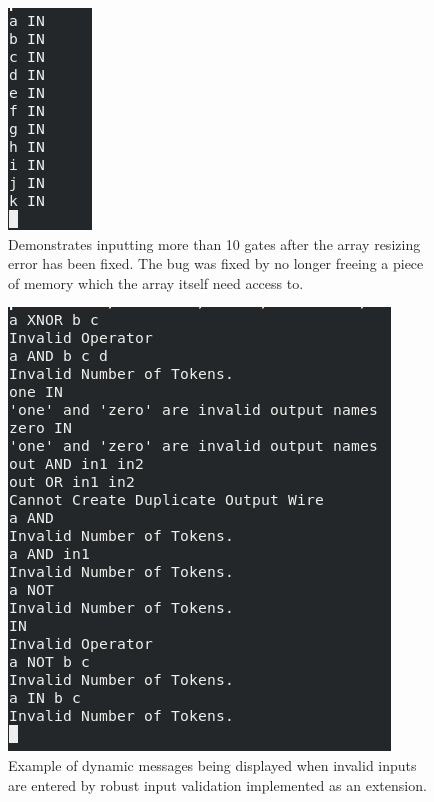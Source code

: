 \documentclass[11]{article}
\begin{document}
				\begin{figure}[h!]
					\caption{Demonstrates inputting more than 10 gates after the array resizing error has been fixed. The bug was fixed by no longer freeing a piece of memory which the array itself need access to.}
					\centering
					\includegraphics[scale=0.6]{FixedArrayListResize.png}
				\end{figure}
				
				\begin{figure}[h!]
					\caption{Example of dynamic messages being displayed when invalid inputs are entered by robust input validation implemented as an extension.}
					\centering
					\includegraphics[scale=0.6]{SuccessfulValidation.png}
				\end{figure}
			
			\newpage \clearpage
\end{document}

